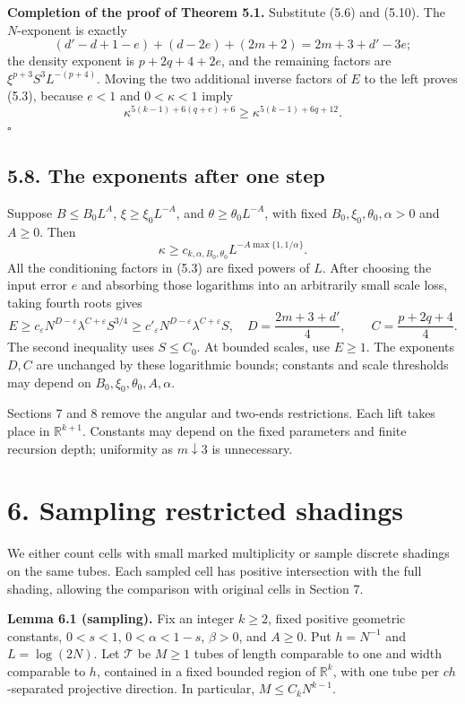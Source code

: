 \documentclass[
  11pt,
  a4paper,
]{article}
\begin{document}
\textbf{Completion of the proof of Theorem 5.1.} Substitute (5.6) and
(5.10). The \(N\)-exponent is exactly \[
 (d'-d+1-e)+(d-2e)+(2m+2)=2m+3+d'-3e;
\] the density exponent is \(p+2q+4+2e\), and the remaining factors are
\(\xi^{p+3}S^3L^{-(p+4)}\). Moving the two additional inverse factors of
\(E\) to the left proves (5.3), because \(e<1\) and \(0<\kappa<1\) imply
\[
 \kappa^{5(k-1)+6(q+e)+6}\ge\kappa^{5(k-1)+6q+12}.
\] \(\square\)

\hypertarget{the-exponents-after-one-step}{%
\subsection{5.8. The exponents after one
step}\label{the-exponents-after-one-step}}

Suppose \(B\le B_0L^A\), \(\xi\ge\xi_0L^{-A}\), and
\(\theta\ge\theta_0L^{-A}\), with fixed \(B_0,\xi_0,\theta_0,\alpha>0\)
and \(A\ge0\). Then \[
 \kappa\ge c_{k,\alpha,B_0,\theta_0}
 L^{-A\max\{1,1/\alpha\}}.
\] All the conditioning factors in (5.3) are fixed powers of \(L\).
After choosing the input error \(e\) and absorbing those logarithms into
an arbitrarily small scale loss, taking fourth roots gives \[
 E\ge c_\varepsilon N^{D-\varepsilon}
 \lambda^{C+\varepsilon}S^{3/4}
 \ge c'_\varepsilon N^{D-\varepsilon}
 \lambda^{C+\varepsilon}S,
 \quad
 D=\frac{2m+3+d'}4,\qquad C=\frac{p+2q+4}4.         \tag{5.35}\label{eq:5.35}
\] The second inequality uses \(S\le C_0\). At bounded scales, use
\(E\ge1\). The exponents \(D,C\) are unchanged by these logarithmic
bounds; constants and scale thresholds may depend on
\(B_0,\xi_0,\theta_0,A,\alpha\).

Sections 7 and 8 remove the angular and two-ends restrictions. Each lift
takes place in \(\mathbb R^{k+1}\). Constants may depend on the fixed
parameters and finite recursion depth; uniformity as \(m\downarrow3\) is
unnecessary.

\hypertarget{sampling-restricted-shadings}{%
\section{6. Sampling restricted
shadings}\label{sampling-restricted-shadings}}

We either count cells with small marked multiplicity or sample discrete
shadings on the same tubes. Each sampled cell has positive intersection
with the full shading, allowing the comparison with original cells in
Section 7.

\textbf{Lemma 6.1 (sampling).} Fix an integer \(k\ge2\), fixed positive
geometric constants, \(0<s<1\), \(0<\alpha<1-s\), \(\beta>0\), and
\(A\ge0\). Put \(h=N^{-1}\) and \(L=\log(2N)\). Let \(\mathcal T\) be
\(M\ge1\) tubes of length comparable to one and width comparable to
\(h\), contained in a fixed bounded region of \(\mathbb R^k\), with one
tube per \(ch\)-separated projective direction. In particular,
\(M\le C_kN^{k-1}\).
\end{document}
